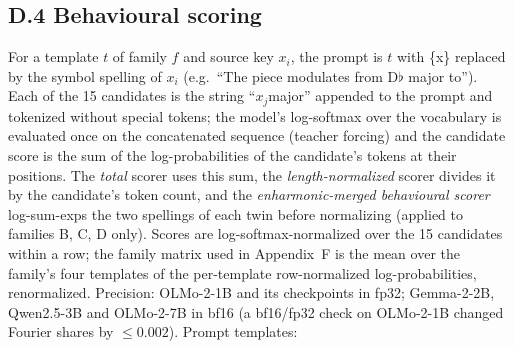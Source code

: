 \documentclass[11pt]{article}
\newcommand{\fl}{$\flat$}
\begin{document}
\subsection*{D.4 Behavioural scoring}
For a template $t$ of family $f$ and source key $x_i$, the prompt is $t$ with \{x\} replaced by the symbol spelling of $x_i$ (e.g.\ ``The piece modulates from D\fl{} major to''). Each of the 15 candidates is the string ``\textvisiblespace$x_j$\textvisiblespace major'' appended to the prompt and tokenized without special tokens; the model's log-softmax over the vocabulary is evaluated once on the concatenated sequence (teacher forcing) and the candidate score is the sum of the log-probabilities of the candidate's tokens at their positions. The \emph{total} scorer uses this sum, the \emph{length-normalized} scorer divides it by the candidate's token count, and the \emph{enharmonic-merged behavioural scorer} log-sum-exps the two spellings of each twin before normalizing (applied to families B, C, D only). Scores are log-softmax-normalized over the 15 candidates within a row; the family matrix used in Appendix~F is the mean over the family's four templates of the per-template row-normalized log-probabilities, renormalized. Precision: OLMo-2-1B and its checkpoints in fp32; Gemma-2-2B, Qwen2.5-3B and OLMo-2-7B in bf16 (a bf16/fp32 check on OLMo-2-1B changed Fourier shares by $\le0.002$). Prompt templates:
\end{document}
